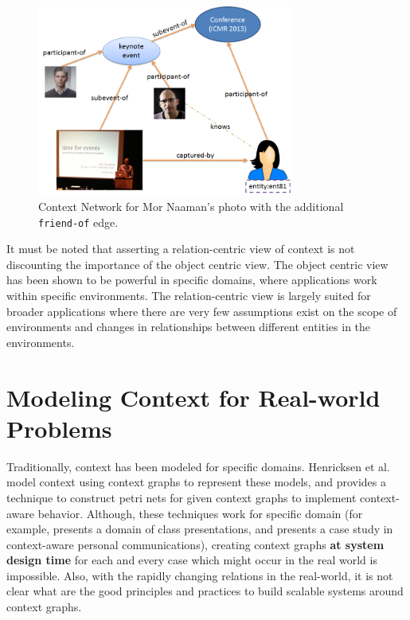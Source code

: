 \begin{figure}[h]
\centering
\includegraphics[width=0.75\textwidth]{media/chapter2/naaman-friends.png}
\caption{Context Network for Mor Naaman's photo with the additional \texttt{friend-of} edge.}
\label{fig:context-network}
\end{figure}

It must be noted that asserting a relation-centric view of context is not discounting the importance of the object centric view. The object centric view has been shown to be powerful in specific domains, where applications work within specific environments. The relation-centric view is largely suited for broader applications where there are very few assumptions exist on the scope of environments and changes in relationships between different entities in the environments.

\section{Modeling Context for Real-world Problems}

Traditionally, context has been modeled for specific domains. Henricksen et al.\ \cite{henricksen2002modeling} model context using context graphs to represent these models, and \cite{reignier2007context} provides a technique to construct petri nets for given context graphs to implement context-aware behavior. Although, these techniques work for specific domain (for example, \cite{reignier2007context} presents a domain of class presentations, and \cite{henricksen2002modeling} presents a case study in context-aware personal communications), creating context graphs \textbf{at system design time} for each and every case which might occur in the real world is impossible. Also, with the rapidly changing relations in the real-world, it is not clear what are the good principles and practices to build scalable systems around context graphs.

